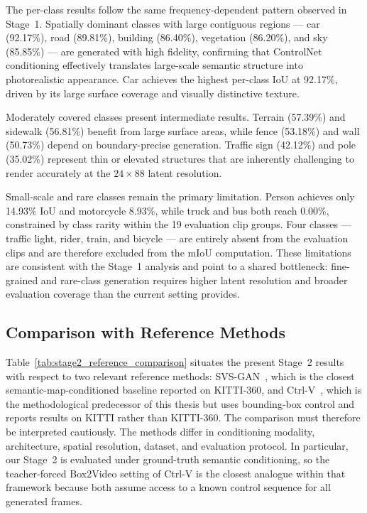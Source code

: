 The per-class results follow the same frequency-dependent pattern observed in Stage~1. Spatially dominant classes with large contiguous regions — car (92.17\%), road (89.81\%), building (86.40\%), vegetation (86.20\%), and sky (85.85\%) — are generated with high fidelity, confirming that ControlNet conditioning effectively translates large-scale semantic structure into photorealistic appearance. Car achieves the highest per-class IoU at 92.17\%, driven by its large surface coverage and visually distinctive texture.

Moderately covered classes present intermediate results. Terrain (57.39\%) and sidewalk (56.81\%) benefit from large surface areas, while fence (53.18\%) and wall (50.73\%) depend on boundary-precise generation. Traffic sign (42.12\%) and pole (35.02\%) represent thin or elevated structures that are inherently challenging to render accurately at the $24 \times 88$ latent resolution.

Small-scale and rare classes remain the primary limitation. Person achieves only 14.93\% IoU and motorcycle 8.93\%, while truck and bus both reach 0.00\%, constrained by class rarity within the 19 evaluation clip groups. Four classes — traffic light, rider, train, and bicycle — are entirely absent from the evaluation clips and are therefore excluded from the mIoU computation. These limitations are consistent with the Stage~1 analysis and point to a shared bottleneck: fine-grained and rare-class generation requires higher latent resolution and broader evaluation coverage than the current setting provides.

\subsection{Comparison with Reference Methods}
\label{subsec:stage2_reference_comparison}

Table~\ref{tab:stage2_reference_comparison} situates the present Stage~2 results with respect to two relevant reference methods: SVS-GAN~\cite{seyam2024svsgan}, which is the closest semantic-map-conditioned baseline reported on KITTI-360, and Ctrl-V~\cite{luo2025ctrlv}, which is the methodological predecessor of this thesis but uses bounding-box control and reports results on KITTI rather than KITTI-360. The comparison must therefore be interpreted cautiously. The methods differ in conditioning modality, architecture, spatial resolution, dataset, and evaluation protocol. In particular, our Stage~2 is evaluated under ground-truth semantic conditioning, so the teacher-forced Box2Video setting of Ctrl-V is the closest analogue within that framework because both assume access to a known control sequence for all generated frames.

